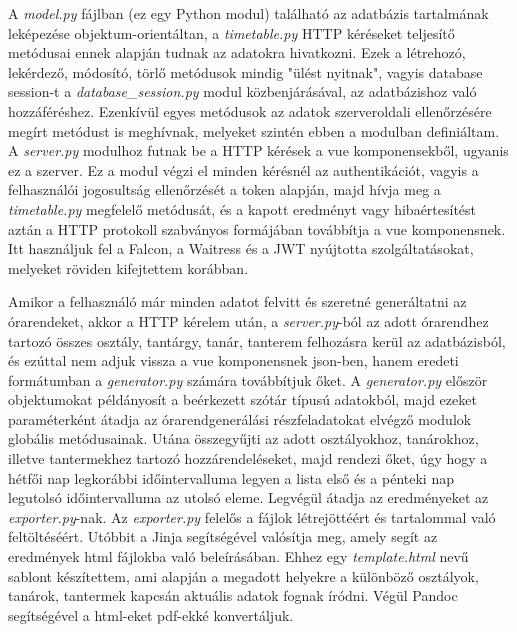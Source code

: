 A \textit{model.py} fájlban (ez egy Python modul) található az adatbázis tartalmának leképezése objektum-orientáltan, a \textit{timetable.py} HTTP kéréseket teljesítő metódusai ennek alapján tudnak az adatokra hivatkozni. Ezek a létrehozó, lekérdező, módosító, törlő metódusok mindig "ülést nyitnak", vagyis database session-t a \textit{database\_session.py} modul közbenjárásával, az adatbázishoz való hozzáféréshez. Ezenkívül egyes metódusok az adatok szerveroldali ellenőrzésére megírt metódust is meghívnak, melyeket szintén ebben a modulban definiáltam. A \textit{server.py} modulhoz futnak be a HTTP kérések a vue komponensekből, ugyanis ez a szerver. Ez a modul végzi el minden kérésnél az authentikációt, vagyis a felhasználói jogosultság ellenőrzését a token alapján, majd hívja meg a \textit{timetable.py} megfelelő metódusát, és a kapott eredményt vagy hibaértesítést aztán a HTTP protokoll szabványos formájában továbbítja a vue komponensnek. Itt használjuk fel a Falcon, a Waitress és a JWT nyújtotta szolgáltatásokat, melyeket röviden kifejtettem korábban.

Amikor a felhasználó már minden adatot felvitt és szeretné generáltatni az órarendeket, akkor a HTTP kérelem után, a \textit{server.py}-ból az adott órarendhez tartozó összes osztály, tantárgy, tanár, tanterem felhozásra kerül az adatbázisból, és ezúttal nem adjuk vissza a vue komponensnek json-ben, hanem eredeti formátumban a \textit{generator.py} számára továbbítjuk őket. A \textit{generator.py} először objektumokat példányosít a beérkezett szótár típusú adatokból, majd ezeket paraméterként átadja az órarendgenerálási részfeladatokat elvégző modulok globális metódusainak. Utána összegyűjti az adott osztályokhoz, tanárokhoz, illetve tantermekhez tartozó hozzárendeléseket, majd rendezi őket, úgy hogy a hétfői nap legkorábbi időintervalluma legyen a lista első és a pénteki nap legutolsó időintervalluma az utolsó eleme. Legvégül átadja az eredményeket az \textit{exporter.py}-nak. Az \textit{exporter.py} felelős a fájlok létrejöttéért és tartalommal való feltöltéséért. Utóbbit a Jinja segítségével valósítja meg, amely segít az eredmények html fájlokba való beleírásában. Ehhez egy \textit{template.html} nevű sablont készítettem, ami alapján a megadott helyekre a különböző osztályok, tanárok, tantermek kapcsán aktuális adatok fognak íródni. Végül Pandoc segítségével a html-eket pdf-ekké konvertáljuk.

